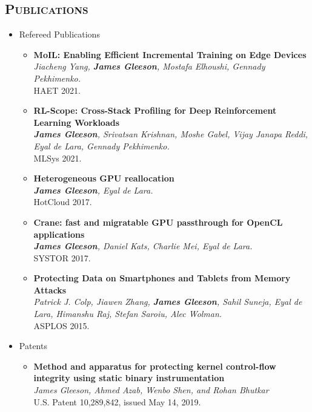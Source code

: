 \documentclass[letterpaper,11pt]{article}
\newcommand{\heading}[1]{
    \textsc{\textbf{#1}}
}
\newcommand*\resheading[1]{\subsection*{\heading{#1}}\vspace{0.3em}\nopagebreak[4]}
\newcommand{\resitem}[1]{\item #1 \vspace{-2pt}}
\newcommand{\ressubheadingnodate}[1]{
		#1 \\
}
\begin{document}
\resheading{Publications}
\begin{itemize}
\item

	\ressubheadingnodate{Refereed Publications}
	\begin{itemize}
        \resitem{
            \textbf{MoIL: Enabling Efficient Incremental Training on Edge Devices} \\
            \textit{Jiacheng Yang, \textbf{James Gleeson}, Mostafa Elhoushi, Gennady Pekhimenko.} \\
            HAET 2021.
        }
        \resitem{
            \textbf{RL-Scope: Cross-Stack Profiling for Deep Reinforcement Learning Workloads} \\
            \textit{\textbf{James Gleeson}, Srivatsan Krishnan, Moshe Gabel, Vijay Janapa Reddi, Eyal de Lara, Gennady Pekhimenko.} \\
            MLSys 2021.
        }
        \resitem{
            \textbf{Heterogeneous GPU reallocation} \\
            \textit{\textbf{James Gleeson}, Eyal de Lara.} \\
            HotCloud 2017.
        }
        \resitem{
            \textbf{Crane: fast and migratable GPU passthrough for OpenCL applications} \\
            \textit{\textbf{James Gleeson}, Daniel Kats, Charlie Mei, Eyal de Lara.} \\
            SYSTOR 2017.
        }
		\resitem{
            \textbf{Protecting Data on Smartphones and Tablets from Memory Attacks} \\
            \textit{Patrick J. Colp, Jiawen Zhang, \textbf{James Gleeson}, Sahil Suneja, Eyal de Lara, Himanshu Raj, Stefan Saroiu, Alec Wolman.} \\
            ASPLOS 2015.
        }
	\end{itemize}
    \item
	\ressubheadingnodate{Patents}
	\begin{itemize}
        \resitem{
            \textbf{Method and apparatus for protecting kernel control-flow integrity using static binary instrumentation} \\
            \textit{James Gleeson, Ahmed Azab, Wenbo Shen, and Rohan Bhutkar} \\
            U.S. Patent 10,289,842, issued May 14, 2019.
        }
	\end{itemize}

\end{itemize}
\end{document}
